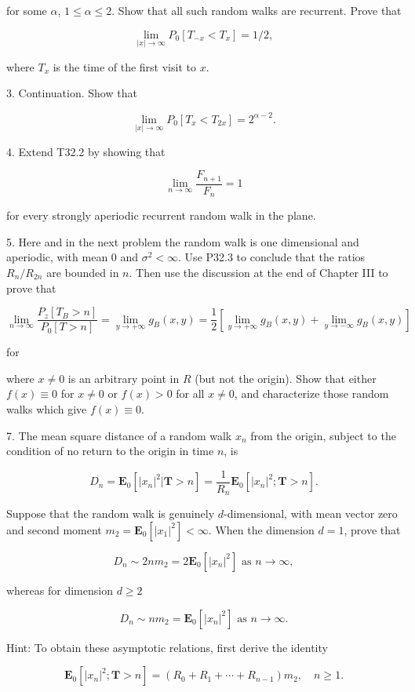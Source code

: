 for some $\alpha$, $1 \leq \alpha \leq 2$. Show that all such random walks are recurrent. Prove that

$$\lim_{|x| \to \infty} P_0[T_{-x} < T_x] = 1/2,$$

where $T_x$ is the time of the first visit to $x$.

3. Continuation. Show that

$$\lim_{|x| \to \infty} P_0[T_x < T_{2x}] = 2^{\alpha-2}.$$

4. Extend T32.2 by showing that

$$\lim_{n \to \infty} \frac{F_{n+1}}{F_n} = 1$$

for every strongly aperiodic recurrent random walk in the plane.

5. Here and in the next problem the random walk is one dimensional and aperiodic, with mean 0 and $\sigma^2 < \infty$. Use P32.3 to conclude that the ratios $R_n/R_{2n}$ are bounded in $n$. Then use the discussion at the end of Chapter III to prove that

$$\lim_{n \to \infty} \frac{P_z[T_B > n]}{P_0[T > n]} = \lim_{y \to +\infty} g_B(x,y) = \frac{1}{2} \left[ \lim_{y \to +\infty} g_B(x,y) + \lim_{y \to -\infty} g_B(x,y) \right]$$

for

where $x \neq 0$ is an arbitrary point in $R$ (but not the origin). Show that either $f(x) \equiv 0$ for $x \neq 0$ or $f(x) > 0$ for all $x \neq 0$, and characterize those random walks which give $f(x) \equiv 0$.

7. The mean square distance of a random walk $x_n$ from the origin, subject to the condition of no return to the origin in time $n$, is

$$D_n = \mathbf{E}_0[|x_n|^2 |\mathbf{T} > n] = \frac{1}{R_n} \mathbf{E}_0[|x_n|^2; \mathbf{T} > n].$$

Suppose that the random walk is genuinely $d$-dimensional, with mean vector zero and second moment $m_2 = \mathbf{E}_0[|x_1|^2] < \infty$. When the dimension $d = 1$, prove that

$$D_n \sim 2nm_2 = 2\mathbf{E}_0[|x_n|^2] \text{ as } n \to \infty,$$

whereas for dimension $d \geq 2$

$$D_n \sim nm_2 = \mathbf{E}_0[|x_n|^2] \text{ as } n \to \infty.$$

Hint: To obtain these asymptotic relations, first derive the identity

$$\mathbf{E}_0[|x_n|^2; \mathbf{T} > n] = (R_0 + R_1 + \cdots + R_{n-1})m_2, \quad n \geq 1.$$

